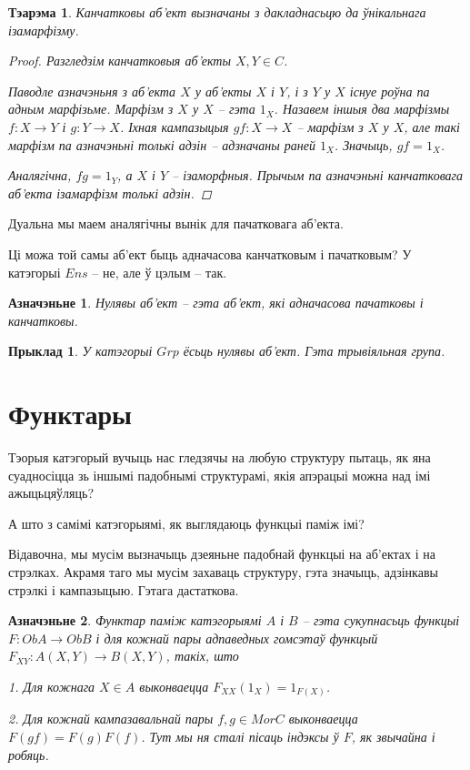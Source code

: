 \documentclass[a4paper,12pt]{book}
\newtheorem{theorem}{Тэарэма}[section]
\newtheorem{example}{Прыклад}[section]
\newtheorem{definition}{Азначэньне}[section]
\begin{document}
\begin{theorem}
  Канчатковы аб'ект вызначаны з дакладнасьцю да ўнікальнага
  ізамарфізму.
  \begin{proof}
    Разгледзім канчатковыя аб'екты $X, Y \in C$.

    Паводле азначэньня з
    аб'екта $X$ у аб'екты $X$ і $Y$, і з $Y$ у $X$ існуе роўна па адным
    марфізьме. Марфізм з $X$ у $X$ -- гэта $1_X$. Назавем іншыя два
    марфізмы $f: X \rightarrow Y$ і $g:Y \rightarrow X$. Іхная
    кампазыцыя $gf: X \rightarrow X$ -- марфізм з $X$ у $X$, але такі
    марфізм па азначэньні толькі адзін -- адзначаны раней
    $1_X$. Значыць, $gf = 1_X$.

    Аналягічна, $fg = 1_Y$, а $X$ і $Y$ -- ізаморфныя. Прычым па
    азначэньні канчатковага аб'екта ізамарфізм толькі адзін.
  \end{proof}
\end{theorem}

Дуальна мы маем аналягічны вынік для пачатковага аб'екта.

Ці можа той самы аб'ект быць адначасова канчатковым і пачатковым? У
катэгорыі $Ens$ -- не, але ў цэлым -- так.

\begin{definition}
  Нулявы аб'ект -- гэта аб'ект, які адначасова пачатковы і канчатковы.
\end{definition}

\begin{example}
  У катэгорыі $Grp$ ёсьць нулявы аб'ект. Гэта трывіяльная група.
\end{example}

\section{Функтары}

Тэорыя катэгорый вучыць нас гледзячы на любую структуру пытаць, як яна
суадносіцца зь іншымі падобнымі структурамі, якія апэрацыі можна над
імі ажыцьцяўляць?

А што з самімі катэгорыямі, як выглядаюць функцыі паміж імі?

Відавочна, мы мусім вызначыць дзеяньне падобнай функцыі на аб'ектах і
на стрэлках. Акрамя таго мы мусім захаваць структуру, гэта значыць,
адзінкавы стрэлкі і кампазыцыю. Гэтага дастаткова.

\begin{definition}
  Функтар паміж катэгорыямі $A$ і $B$ -- гэта сукупнасьць функцыі
  $F:Ob A \rightarrow Ob B$ і для кожнай пары адпаведных гомсэтаў
  функцый $F_{XY}: A(X, Y) \rightarrow B(X, Y)$, такіх, што

  1. Для кожнага $X \in A$ выконваецца $F_{XX}(1_X) = 1_{F(X)}$.

  2. Для кожнай кампазавальнай пары $f, g \in Mor C$ выконваецца
  $F(gf) = F(g)F(f)$. Тут мы ня сталі пісаць індэксы ў $F$, як
  звычайна і робяць.
\end{definition}
\end{document}
